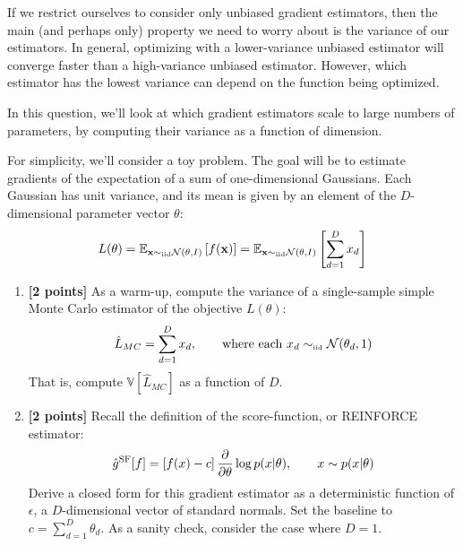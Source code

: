 \documentclass{harvardml}
\def\simiid{\sim_{\mbox{\tiny iid}}}
\newcommand{\bx}{\mathbf{x}}
\newcommand{\distNorm}{\mathcal{N}}
\newcommand{\var}{\mathbb{V}}
\newcommand{\E}{\mathbb{E}}
\newcommand{\PT}{\frac{\partial}{\partial \theta}}
\theoremstyle{plain}
\begin{document}









\begin{problem}

If we restrict ourselves to consider only unbiased gradient estimators, then the main (and perhaps only) property we need to worry about is the variance of our estimators.
In general, optimizing with a lower-variance unbiased estimator will converge faster than a high-variance unbiased estimator.
However, which estimator has the lowest variance can depend on the function being optimized.

In this question, we'll look at which gradient estimators scale to large numbers of parameters, by computing their variance as a function of dimension.

For simplicity, we'll consider a toy problem.
The goal will be to estimate gradients of the expectation of a sum of one-dimensional Gaussians.
Each Gaussian has unit variance, and its mean is given by an element of the $D$-dimensional parameter vector $\theta$:
%
\begin{align}
L(\theta) 
= \E_{\bx \simiid \distNorm(\theta, I)} \left[ f(\bx) \right]
= \E_{\bx \simiid \distNorm(\theta, I)} \left[ \sum_{d=1}^D x_d \right]
\end{align}



\begin{enumerate}[label=(\alph*)]
\item {\bf [2 points]} As a warm-up, compute the variance of a single-sample simple Monte Carlo estimator of the objective $L(\theta)$:
%
\begin{align}
\hat L_{MC} 
= \sum_{d=1}^D x_d, \qquad \textnormal{where each } x_d \simiid \distNorm(\theta_d, 1)
\end{align}
%
That is, compute $\var \left[ \hat L_{MC} \right]$ as a function of $D$.

\item {\bf [2 points]}
Recall the definition of the score-function, or REINFORCE estimator:
%
\begin{align}
\hat g^\textnormal{SF}[f] = \left[f(x) - c\right] \PT \log p(x | \theta), \qquad x \sim p(x | \theta)
\end{align}
%
Derive a closed form for this gradient estimator as a deterministic function of $\epsilon$, a $D$-dimensional vector of standard normals.
Set the baseline to $c = \sum_{d=1}^D \theta_d$.
As a sanity check, consider the case where $D = 1$.


\end{enumerate}
\end{problem}
\end{document}

